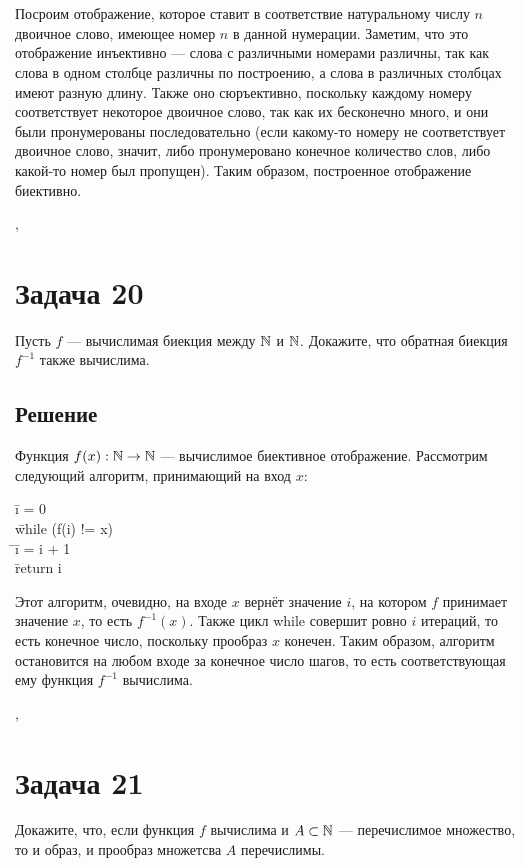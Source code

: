 \documentclass[a4paper,12pt]{article}
\newcommand {\gu} [1] {\guillemotleft#1\guillemotright}
\newcommand{\tab}{\quad\=}
\newenvironment{programm}{
    \ttfamily
    \begin{tabbing}
    }
    {
    \end{tabbing}
}
\begin{document}
	\\\\
	Посроим отображение, которое ставит в соответствие натуральному числу $n$ двоичное слово, имеющее номер $n$ в данной нумерации. Заметим, что это отображение инъективно --- слова с различными номерами различны, так как слова в одном столбце различны по построению, а слова в различных столбцах имеют разную длину. Также оно сюръективно, поскольку каждому номеру соответствует некоторое двоичное слово, так как их бесконечно много, и они были пронумерованы последовательно (если какому-то номеру не соответствует двоичное слово, значит, либо пронумеровано конечное количество слов, либо какой-то номер был \gu{пропущен}). Таким образом, построенное отображение биективно.

	\sep	
		
		
	\section*{Задача 20}
	Пусть $f$ --- вычислимая биекция между $\mathbb{N}$ и $\mathbb{N}$. Докажите, что обратная биекция $f^{-1}$ также вычислима.

	
	\subsection*{Решение}
	Функция $f(x):\mathbb{N}\to\mathbb{N}$ --- вычислимое биективное отображение. Рассмотрим следующий алгоритм, принимающий на вход $x$:
	\begin{programm}
	\tab i = 0\\
	\tab while (f(i) != x)\\
	\tab\tab i = i + 1\\
	\tab return i
	\end{programm}
    Этот алгоритм, очевидно, на входе $x$ вернёт значение $i$, на котором $f$ принимает значение $x$, то есть $f^{-1}(x)$. Также цикл {\ttfamily while} совершит ровно $i$ итераций, то есть конечное число, поскольку прообраз $x$ конечен. Таким образом, алгоритм остановится на любом входе за конечное число шагов, то есть соответствующая ему функция $f^{-1}$ вычислима.

	\sep		
	
	
	
	
	\section*{Задача 21}
    Докажите, что, если функция $f$ вычислима и $A \subset \mathbb{N}$ --- перечислимое множество, то и образ, и прообраз множетсва $A$ перечислимы.
	
\end{document}
